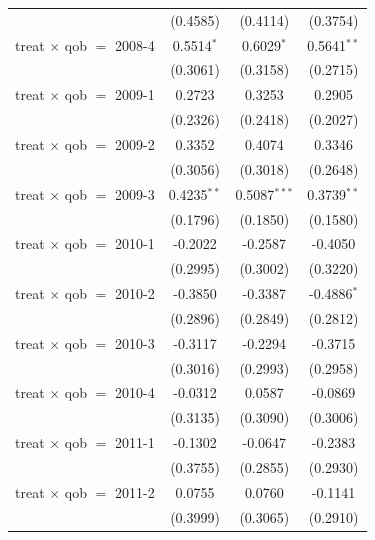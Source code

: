 \begin{table}[htbp]
\begin{tabular}{lccc}
                                     & (0.4585)      & (0.4114)       & (0.3754)\\   
      treat $\times$ qob $=$ 2008-4  & 0.5514$^{*}$  & 0.6029$^{*}$   & 0.5641$^{**}$\\   
                                     & (0.3061)      & (0.3158)       & (0.2715)\\   
      treat $\times$ qob $=$ 2009-1  & 0.2723        & 0.3253         & 0.2905\\   
                                     & (0.2326)      & (0.2418)       & (0.2027)\\   
      treat $\times$ qob $=$ 2009-2  & 0.3352        & 0.4074         & 0.3346\\   
                                     & (0.3056)      & (0.3018)       & (0.2648)\\   
      treat $\times$ qob $=$ 2009-3  & 0.4235$^{**}$ & 0.5087$^{***}$ & 0.3739$^{**}$\\   
                                     & (0.1796)      & (0.1850)       & (0.1580)\\   
      treat $\times$ qob $=$ 2010-1  & -0.2022       & -0.2587        & -0.4050\\   
                                     & (0.2995)      & (0.3002)       & (0.3220)\\   
      treat $\times$ qob $=$ 2010-2  & -0.3850       & -0.3387        & -0.4886$^{*}$\\   
                                     & (0.2896)      & (0.2849)       & (0.2812)\\   
      treat $\times$ qob $=$ 2010-3  & -0.3117       & -0.2294        & -0.3715\\   
                                     & (0.3016)      & (0.2993)       & (0.2958)\\   
      treat $\times$ qob $=$ 2010-4  & -0.0312       & 0.0587         & -0.0869\\   
                                     & (0.3135)      & (0.3090)       & (0.3006)\\   
      treat $\times$ qob $=$ 2011-1  & -0.1302       & -0.0647        & -0.2383\\   
                                     & (0.3755)      & (0.2855)       & (0.2930)\\   
      treat $\times$ qob $=$ 2011-2  & 0.0755        & 0.0760         & -0.1141\\   
                                     & (0.3999)      & (0.3065)       & (0.2910)\\   

\end{tabular}
\end{table}
